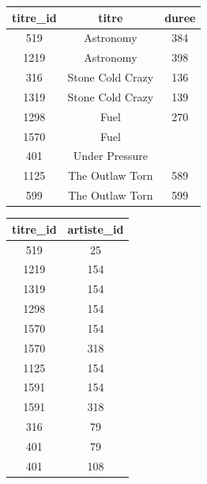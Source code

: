 \documentclass[a4paper,10pt,french]{book}
\begin{document}
    \begin{center}
        \begin{tabular}{|c|c|c|}
            \hline
            \rowcolor{UGLiOrange} \color{white}\textbf{titre\_id} &\color{white}\textbf{titre}&\color{white}\textbf{duree}\\
            \hline
            519 & Astronomy			&\color{white}384 \\
            \hline
            1219 &Astronomy	&\color{white}398 \\
            \hline
            316 & Stone Cold Crazy & 136\\
            \hline
            1319 & Stone Cold Crazy & 139\\
            \hline
            1298	&	\color{white}Fuel		&270\\
            \hline
            1570& \color{white}Fuel& \\
            \hline
            401 & \color{white}Under Pressure& \\
            \hline
            1125 & The Outlaw Torn& 589 \\
            \hline
            599 & The Outlaw Torn &599\\
            \hline
        \end{tabular}\hspace*{2em}
        \begin{tabular}{|c|c|}
            \hline
            \rowcolor{UGLiOrange} \color{white}\textbf{titre\_id} &\color{white}\textbf{artiste\_id}\\
            \hline
            519 & 25		\\
            \hline
            1219 &154	 \\
            \hline
            1319 &\color{white}154 \\
            \hline
            1298 & 154\\
            \hline
            1570	&154\\
            \hline
            1570&  318\\
            \hline
            1125 & 154 \\
            \hline
            1591 & 154\\
            \hline
            1591 & 318\\
            \hline
            316 & 79\\
            \hline
            401 & 79\\
            \hline
            401 & 108\\

\end{tabular}
\end{center}
\end{document}
